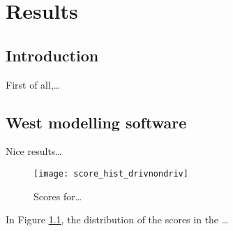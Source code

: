 
\chapter[Results]%
{Results}

\section{Introduction}
First of all,\ldots

\section{West modelling software}
Nice results\ldots

\begin{figure}[ht]%
\texttt{[image: score\_hist\_drivnondriv]}%
\caption{Scores for\ldots}%
\label{scoredriv}%
\end{figure}


In Figure \ref{scoredriv}, the distribution of the scores in the \ldots


